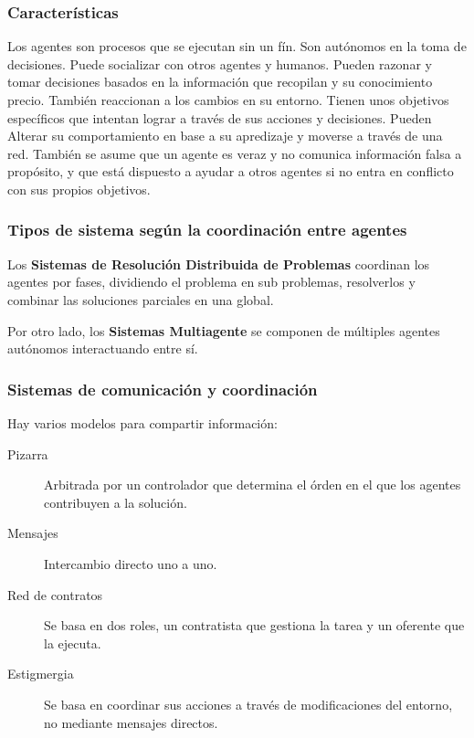     \subsubsection{Características}
        Los agentes son procesos que se ejecutan sin un fín. Son autónomos en la toma de decisiones. Puede socializar con otros agentes y humanos. Pueden razonar y tomar decisiones basados en la información que recopilan y su conocimiento precio. También reaccionan a los cambios en su entorno. Tienen unos objetivos específicos que intentan lograr a través de sus acciones y decisiones. Pueden Alterar su comportamiento en base a su apredizaje y moverse a través de una red. También se asume que un agente es veraz y no comunica información falsa a propósito, y que está dispuesto a ayudar a otros agentes si no entra en conflicto con sus propios objetivos.

    \subsubsection{Tipos de sistema según la coordinación entre agentes}
        Los \textbf{Sistemas de Resolución Distribuida de Problemas} coordinan los agentes por fases, dividiendo el problema en sub problemas, resolverlos y combinar las soluciones parciales en una global.

        Por otro lado, los \textbf{Sistemas Multiagente} se componen de múltiples agentes autónomos interactuando entre sí.

    \subsubsection{Sistemas de comunicación y coordinación}
        Hay varios modelos para compartir información:
        \begin{description}
            \item[Pizarra] Arbitrada por un controlador que determina el órden en el que los agentes contribuyen a la solución.
            \item[Mensajes] Intercambio directo uno a uno.
            \item[Red de contratos] Se basa en dos roles, un contratista que gestiona la tarea y un oferente que la ejecuta.
            \item[Estigmergia] Se basa en coordinar sus acciones a través de modificaciones del entorno, no mediante mensajes directos.
        \end{description}

